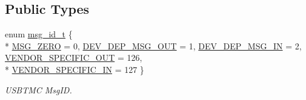 \subsection*{Public Types}
\begin{DoxyCompactItemize}
\item 
enum \hyperlink{classmdt_frame_usb_tmc_a10c2216157b0616b69f6cabc5c8e253b}{msg\-\_\-id\-\_\-t} \{ \\*
\hyperlink{classmdt_frame_usb_tmc_a10c2216157b0616b69f6cabc5c8e253ba5faf83c861e5c3ea0faa73d276b3cebd}{M\-S\-G\-\_\-\-Z\-E\-R\-O} = 0, 
\hyperlink{classmdt_frame_usb_tmc_a10c2216157b0616b69f6cabc5c8e253bac179e40351460bf53a74d5654ae6a79e}{D\-E\-V\-\_\-\-D\-E\-P\-\_\-\-M\-S\-G\-\_\-\-O\-U\-T} = 1, 
\hyperlink{classmdt_frame_usb_tmc_a10c2216157b0616b69f6cabc5c8e253ba89fd5ab2298285f5a91e3b2f3822a7aa}{D\-E\-V\-\_\-\-D\-E\-P\-\_\-\-M\-S\-G\-\_\-\-I\-N} = 2, 
\hyperlink{classmdt_frame_usb_tmc_a10c2216157b0616b69f6cabc5c8e253bafb1be2ba00b4830e457e933e4497a593}{V\-E\-N\-D\-O\-R\-\_\-\-S\-P\-E\-C\-I\-F\-I\-C\-\_\-\-O\-U\-T} = 126, 
\\*
\hyperlink{classmdt_frame_usb_tmc_a10c2216157b0616b69f6cabc5c8e253baf6fe219e0ce27a6a793db4b4a5c2a686}{V\-E\-N\-D\-O\-R\-\_\-\-S\-P\-E\-C\-I\-F\-I\-C\-\_\-\-I\-N} = 127
 \}
\begin{DoxyCompactList}\small\item\em U\-S\-B\-T\-M\-C Msg\-I\-D. \end{DoxyCompactList}\end{DoxyCompactItemize}
